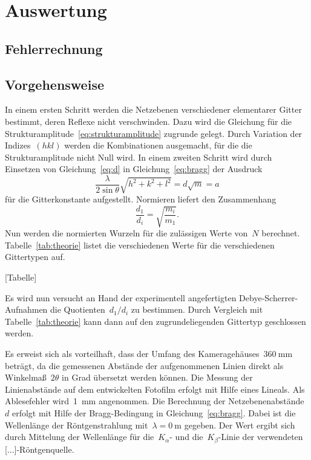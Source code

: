 ﻿\section{Auswertung}
\label{sec:auswertung}

\subsection{Fehlerrechnung}



\subsection{Vorgehensweise}

In einem ersten Schritt werden die Netzebenen verschiedener elementarer Gitter
bestimmt, deren Reflexe nicht verschwinden. Dazu wird die Gleichung für die
Strukturamplitude~\eqref{eq:strukturamplitude} zugrunde gelegt. Durch Variation
der Indizes~$(hkl)$ werden die Kombinationen ausgemacht, für die die
Strukturamplitude nicht Null wird. In einem zweiten Schritt wird durch Einsetzen
von Gleichung~\eqref{eq:d} in Gleichung~\eqref{eq:bragg} der Ausdruck
%
\begin{equation}
  \frac{\lambda}{2\sin\theta}\sqrt{h^2+k^2+l^2}=d\sqrt{m}=a
  \label{eq:a}
\end{equation}
%
für die Gitterkonstante aufgestellt. Normieren liefert den Zusammenhang
%
\begin{equation}
  \frac{d_1}{d_i}=\sqrt{\frac{m_i}{m_1}}.
\end{equation}
%
Nun werden die normierten Wurzeln für die zulässigen Werte von~$N$ berechnet.
Tabelle~\ref{tab:theorie} listet die verschiedenen Werte für die verschiedenen
Gittertypen auf.

[Tabelle]

Es wird nun versucht an Hand der experimentell angefertigten
Debye-Scherrer-Aufnahmen die Quotienten~$d_1/d_i$ zu bestimmen. Durch Vergleich
mit Tabelle~\ref{tab:theorie} kann dann auf den zugrundeliegenden Gittertyp
geschlossen werden.

Es erweist sich als vorteilhaft, dass der Umfang des
Kameragehäuses~$\SI{360}{\milli\metre}$ beträgt, da die gemessenen Abstände der
aufgenommenen Linien direkt als Winkelmaß~$2\theta$ in Grad übersetzt werden
können. Die Messung der Linienabstände auf dem entwickelten Fotofilm erfolgt mit
Hilfe eines Lineals. Als Ablesefehler wird~\SI{1}{\milli\metre} angenommen. Die
Berechnung der Netzebenenabstände~$d$ erfolgt mit Hilfe der Bragg-Bedingung in
Gleichung~\eqref{eq:bragg}. Dabei ist die Wellenlänge der Röntgenstrahlung
mit~$\lambda=\SI{0}{\metre}$ gegeben. Der Wert ergibt sich durch Mittelung der
Wellenlänge für die~$K_{\alpha}$- und die~$K_{\beta}$-Linie der verwendeten
[...]-Röntgenquelle.

